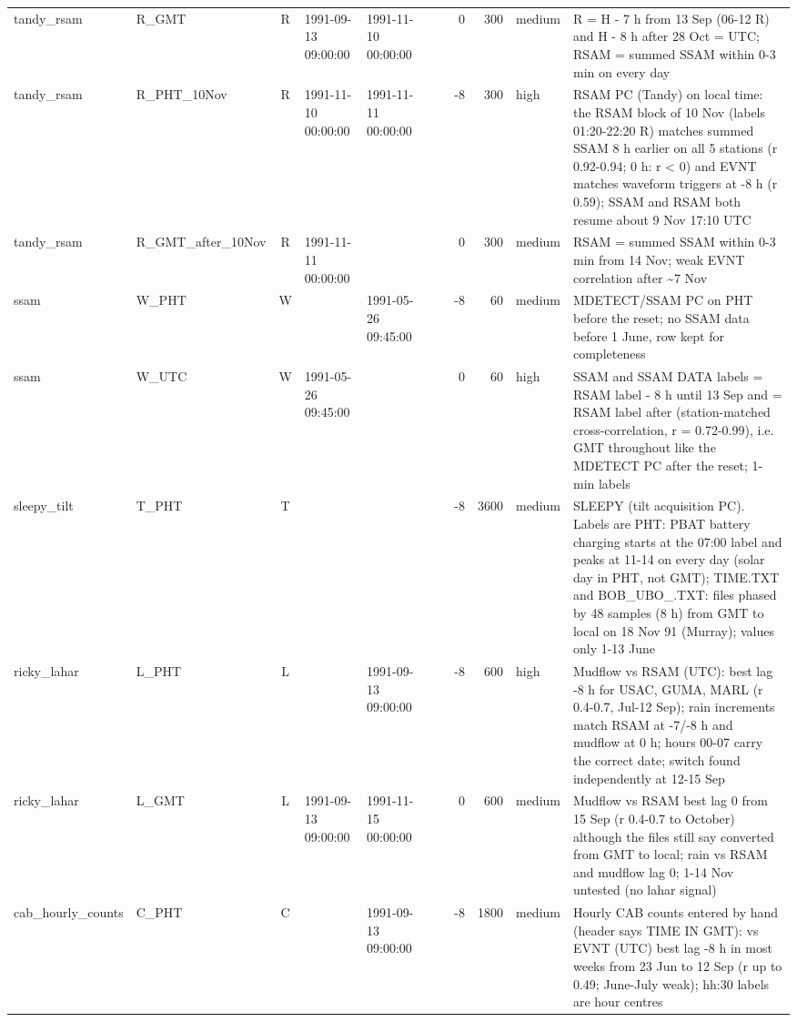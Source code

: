 \begin{landscape}
{\begin{longtable}{>{\raggedright}p{2.7cm}>{\raggedright}p{2.6cm}c>{\raggedright}p{1.6cm}>{\raggedright}p{1.6cm}>{\raggedright}p{2.9cm}rrrl>{\raggedright\arraybackslash}p{5.5cm}}
tandy\_rsam & R\_\allowbreak{}GMT & R & 1991-09-13 09:00:00 & 1991-11-10 00:00:00 &  &  & 0 & 300 & medium & R = H - 7 h from 13 Sep (06-12 R) and H - 8 h after 28 Oct = UTC; RSAM = summed SSAM within 0-3 min on every day\\
tandy\_rsam & R\_\allowbreak{}PHT\_\allowbreak{}10Nov & R & 1991-11-10 00:00:00 & 1991-11-11 00:00:00 &  &  & -8 & 300 & high & RSAM PC (Tandy) on local time: the RSAM block of 10 Nov (labels 01:20-22:20 R) matches summed SSAM 8 h earlier on all 5 stations (r 0.92-0.94; 0 h: r < 0) and EVNT matches waveform triggers at -8 h (r 0.59); SSAM and RSAM both resume about 9 Nov 17:10 UTC\\
tandy\_rsam & R\_\allowbreak{}GMT\_\allowbreak{}after\_\allowbreak{}10Nov & R & 1991-11-11 00:00:00 &  &  &  & 0 & 300 & medium & RSAM = summed SSAM within 0-3 min from 14 Nov; weak EVNT correlation after \textasciitilde{}7 Nov\\
ssam & W\_\allowbreak{}PHT & W &  & 1991-05-26 09:45:00 &  &  & -8 & 60 & medium & MDETECT/SSAM PC on PHT before the reset; no SSAM data before 1 June, row kept for completeness\\
ssam & W\_\allowbreak{}UTC & W & 1991-05-26 09:45:00 &  &  &  & 0 & 60 & high & SSAM and SSAM DATA labels = RSAM label - 8 h until 13 Sep and = RSAM label after (station-matched cross-correlation, r = 0.72-0.99), i.e. GMT throughout like the MDETECT PC after the reset; 1-min labels\\
sleepy\_tilt & T\_\allowbreak{}PHT & T &  &  &  &  & -8 & 3600 & medium & SLEEPY (tilt acquisition PC). Labels are PHT: PBAT battery charging starts at the 07:00 label and peaks at 11-14 on every day (solar day in PHT, not GMT); TIME.TXT and BOB\_UBO\_.TXT: files phased by 48 samples (8 h) from GMT to local on 18 Nov 91 (Murray); values only 1-13 June\\
ricky\_lahar & L\_\allowbreak{}PHT & L &  & 1991-09-13 09:00:00 &  &  & -8 & 600 & high & Mudflow vs RSAM (UTC): best lag -8 h for USAC, GUMA, MARL (r 0.4-0.7, Jul-12 Sep); rain increments match RSAM at -7/-8 h and mudflow at 0 h; hours 00-07 carry the correct date; switch found independently at 12-15 Sep\\
ricky\_lahar & L\_\allowbreak{}GMT & L & 1991-09-13 09:00:00 & 1991-11-15 00:00:00 &  &  & 0 & 600 & medium & Mudflow vs RSAM best lag 0 from 15 Sep (r 0.4-0.7 to October) although the files still say converted from GMT to local; rain vs RSAM and mudflow lag 0; 1-14 Nov untested (no lahar signal)\\
cab\_hourly\_counts & C\_\allowbreak{}PHT & C &  & 1991-09-13 09:00:00 &  &  & -8 & 1800 & medium & Hourly CAB counts entered by hand (header says TIME IN GMT): vs EVNT (UTC) best lag -8 h in most weeks from 23 Jun to 12 Sep (r up to 0.49; June-July weak); hh:30 labels are hour centres\\

\end{longtable}}
\end{landscape}
